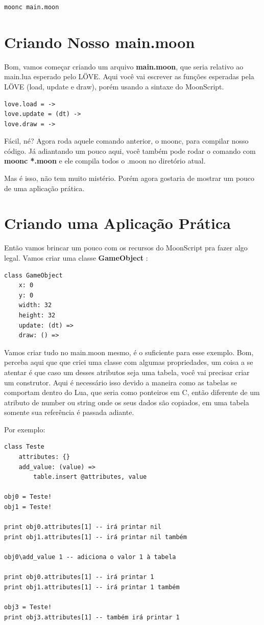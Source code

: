 \documentclass[a4paper,oneside,12pt]{article}
\newcommand{\mybox}[1]{
    \colorbox{backcolour}{\textbf{#1}}
}
\begin{document}
\begin{lstlisting}
moonc main.moon
\end{lstlisting}

\section{Criando Nosso main.moon}

Bom, vamos começar criando um arquivo \textbf{main.moon}, que seria relativo ao main.lua esperado pelo LÖVE. Aqui você vai escrever as funções esperadas pela LÖVE (load, update e draw), porém usando a sintaxe do MoonScript.

\begin{lstlisting}[language={[5.2]Lua}]
love.load = ->
love.update = (dt) ->
love.draw = ->
\end{lstlisting}

Fácil, né? Agora roda aquele comando anterior, o moonc, para compilar nosso código. Já adiantando um pouco aqui, você também pode rodar o comando com \mybox{moonc *.moon} e ele compila todos o .moon no diretório atual.

Mas é isso, não tem muito mistério. Porém agora gostaria de mostrar um pouco de uma aplicação prática.

\section{Criando uma Aplicação Prática}

Então vamos brincar um pouco com os recursos do MoonScript pra fazer algo legal. Vamos criar uma classe \mybox{GameObject}:

\begin{lstlisting}
class GameObject
    x: 0
    y: 0
    width: 32
    height: 32
    update: (dt) =>
    draw: () =>
\end{lstlisting}

Vamos criar tudo no main.moon mesmo, é o suficiente para esse exemplo. Bom, perceba aqui que que criei uma classe com algumas propriedades, um coisa a se atentar é que caso um desses atributos seja uma tabela, você vai precisar criar um construtor. Aqui é necessário isso devido a maneira como as tabelas se comportam dentro do Lua, que seria como ponteiros em C, então diferente de um atributo de number ou string onde os seus dados são copiados, em uma tabela somente sua referência é passada adiante.

Por exemplo:

\begin{lstlisting}
class Teste
    attributes: {}
    add_value: (value) =>
        table.insert @attributes, value

obj0 = Teste!
obj1 = Teste!

print obj0.attributes[1] -- irá printar nil
print obj1.attributes[1] -- irá printar nil também

obj0\add_value 1 -- adiciona o valor 1 à tabela

print obj0.attributes[1] -- irá printar 1
print obj1.attributes[1] -- irá printar 1 também

obj3 = Teste!
print obj3.attributes[1] -- também irá printar 1
\end{lstlisting}
\end{document}
